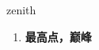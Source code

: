 
\begin{frame}
{\huge zenith}
\begin{center}
\begin{enumerate}\Large
  \item \textbf{最高点，巅峰}
\end{enumerate}
\end{center}
\end{frame}
